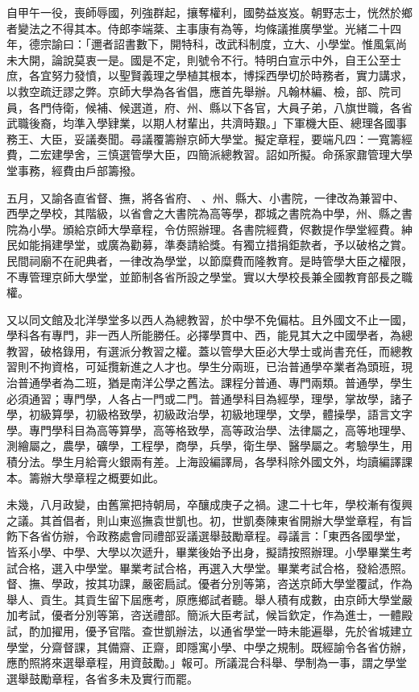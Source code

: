 \begin{pinyinscope}
自甲午一役，喪師辱國，列強群起，攘奪權利，國勢益岌岌。朝野志士，恍然於鄉者變法之不得其本。侍郎李端棻、主事康有為等，均條議推廣學堂。光緒二十四年，德宗諭曰：「邇者詔書數下，開特科，改武科制度，立大、小學堂。惟風氣尚未大開，論說莫衷一是。國是不定，則號令不行。特明白宣示中外，自王公至士庶，各宜努力發憤，以聖賢義理之學植其根本，博採西學切於時務者，實力講求，以救空疏迂謬之弊。京師大學為各省倡，應首先舉辦。凡翰林編、檢，部、院司員，各門侍衛，候補、候選道，府、州、縣以下各官，大員子弟，八旗世職，各省武職後裔，均準入學肄業，以期人材輩出，共濟時艱。」下軍機大臣、總理各國事務王、大臣，妥議奏聞。尋議覆籌辦京師大學堂。擬定章程，要端凡四：一寬籌經費，二宏建學舍，三慎選管學大臣，四簡派總教習。詔如所擬。命孫家鼐管理大學堂事務，經費由戶部籌撥。

五月，又諭各直省督、撫，將各省府、、州、縣大、小書院，一律改為兼習中、西學之學校，其階級，以省會之大書院為高等學，郡城之書院為中學，州、縣之書院為小學。頒給京師大學章程，令仿照辦理。各書院經費，侭數提作學堂經費。紳民如能捐建學堂，或廣為勸募，準奏請給獎。有獨立措捐鉅款者，予以破格之賞。民間祠廟不在祀典者，一律改為學堂，以節糜費而隆教育。是時管學大臣之權限，不專管理京師大學堂，並節制各省所設之學堂。實以大學校長兼全國教育部長之職權。

又以同文館及北洋學堂多以西人為總教習，於中學不免偏枯。且外國文不止一國，學科各有專門，非一西人所能勝任。必擇學貫中、西，能見其大之中國學者，為總教習，破格錄用，有選派分教習之權。蓋以管學大臣必大學士或尚書充任，而總教習則不拘資格，可延攬新進之人才也。學生分兩班，已治普通學卒業者為頭班，現治普通學者為二班，猶是南洋公學之舊法。課程分普通、專門兩類。普通學，學生必須通習；專門學，人各占一門或二門。普通學科目為經學，理學，掌故學，諸子學，初級算學，初級格致學，初級政治學，初級地理學，文學，體操學，語言文字學。專門學科目為高等算學，高等格致學，高等政治學、法律屬之，高等地理學、測繪屬之，農學，礦學，工程學，商學，兵學，衛生學、醫學屬之。考驗學生，用積分法。學生月給膏火銀兩有差。上海設編譯局，各學科除外國文外，均讀編譯課本。籌辦大學章程之概要如此。

未幾，八月政變，由舊黨把持朝局，卒釀成庚子之禍。逮二十七年，學校漸有復興之議。其首倡者，則山東巡撫袁世凱也。初，世凱奏陳東省開辦大學堂章程，有旨飭下各省仿辦，令政務處會同禮部妥議選舉鼓勵章程。尋議言：「東西各國學堂，皆系小學、中學、大學以次遞升，畢業後始予出身，擬請按照辦理。小學畢業生考試合格，選入中學堂。畢業考試合格，再選入大學堂。畢業考試合格，發給憑照。督、撫、學政，按其功課，嚴密扃試。優者分別等第，咨送京師大學堂覆試，作為舉人、貢生。其貢生留下屆應考，原應鄉試者聽。舉人積有成數，由京師大學堂嚴加考試，優者分別等第，咨送禮部。簡派大臣考試，候旨欽定，作為進士，一體殿試，酌加擢用，優予官階。查世凱辦法，以通省學堂一時未能遍舉，先於省城建立學堂，分齋督課，其備齋、正齋，即隱寓小學、中學之規制。既經諭令各省仿辦，應酌照將來選舉章程，用資鼓勵。」報可。所議混合科舉、學制為一事，謂之學堂選舉鼓勵章程，各省多未及實行而罷。


\end{pinyinscope}
